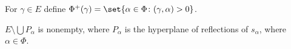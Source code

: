 For $\gamma \in E$ define $\Phi^+(\gamma) = \set{\alpha \in \Phi\colon (\gamma, \alpha) > 0}$.

$E\setminus \bigcup P_\alpha$ is nonempty, where $P_\alpha$ is the hyperplane of
reflections of $s_\alpha$, where $\alpha \in \Phi$.
